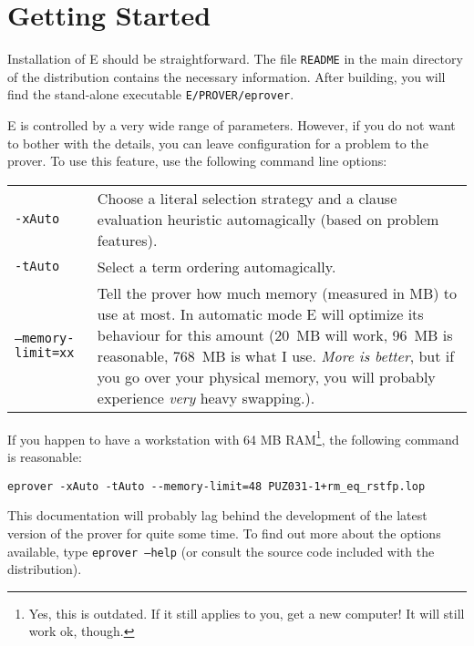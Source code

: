 \documentclass{article}
\begin{document}
\section{Getting Started}
\label{sec:start}

Installation of E should be straightforward. The file \texttt{README}
in the main directory of the distribution contains the necessary
information. After building, you will find the stand-alone executable
\texttt{E/PROVER/eprover}.

E is controlled by a very wide range of parameters. However, if you do
not want to bother with the details, you can leave configuration for a
problem to the prover. To use this feature, use the following command
line options:

\bigskip
\noindent
\begin{tabular}{lp{7.5cm}}
  \texttt{-xAuto} & Choose a literal selection strategy and a
  clause evaluation heuristic automagically\index{xyzzy} (based on
  problem features).\\
  \texttt{-tAuto} & Select a term ordering automagically.\\
  \texttt{--memory-limit=xx} & Tell the prover how much memory
  (measured in MB) to use at most. In automatic mode E will optimize
  its behaviour for this amount (20~MB will work, 96~MB is
  reasonable, 768~MB is what I use. \emph{More is
  better}\footnotemark, but if you go over
  your physical memory, you will probably experience \emph{very} heavy
  swapping.).\\
\end{tabular}
\begin{example}
  If you happen to have a workstation with 64 MB RAM\footnote{Yes,
    this is outdated. If it still applies to you, get a new
    computer! It will still work ok, though.}, the following command
  is reasonable:  
\small
\begin{verbatim}
eprover -xAuto -tAuto --memory-limit=48 PUZ031-1+rm_eq_rstfp.lop
\end{verbatim}
  \normalsize
\end{example}

This documentation will probably lag behind the development of the
latest version of the prover for quite some time. To find out more
about the options available, type \texttt{eprover --help} (or consult
the source code included with the distribution).
\end{document}
